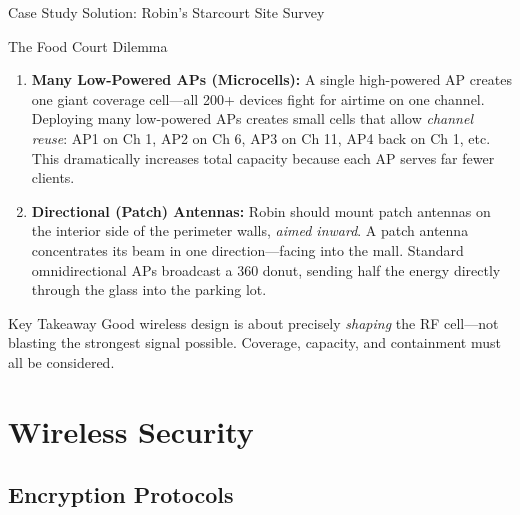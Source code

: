 \documentclass[aspectratio=169]{beamer}
\begin{document}
\begin{frame}{Case Study Solution: Robin's Starcourt Site Survey}
    \begin{casesolution}{The Food Court Dilemma}
        \footnotesize
        \begin{enumerate}
            \item \textbf{Many Low-Powered APs (Microcells):} A single high-powered AP creates one giant coverage cell---all 200+ devices fight for airtime on one channel. Deploying many low-powered APs creates small cells that allow \emph{channel reuse}: AP1 on Ch 1, AP2 on Ch 6, AP3 on Ch 11, AP4 back on Ch 1, etc. This dramatically increases total capacity because each AP serves far fewer clients.

            \item \textbf{Directional (Patch) Antennas:} Robin should mount patch antennas on the interior side of the perimeter walls, \emph{aimed inward}. A patch antenna concentrates its beam in one direction---facing into the mall. Standard omnidirectional APs broadcast a 360\textdegree{} donut, sending half the energy directly through the glass into the parking lot.
        \end{enumerate}
    \end{casesolution}

    \begin{alertblock}{Key Takeaway}
        \footnotesize
        Good wireless design is about precisely \emph{shaping} the RF cell---not blasting the strongest signal possible. Coverage, capacity, and containment must all be considered.
    \end{alertblock}
\end{frame}

\section{Wireless Security}
\subsection{Encryption Protocols}

\end{document}
